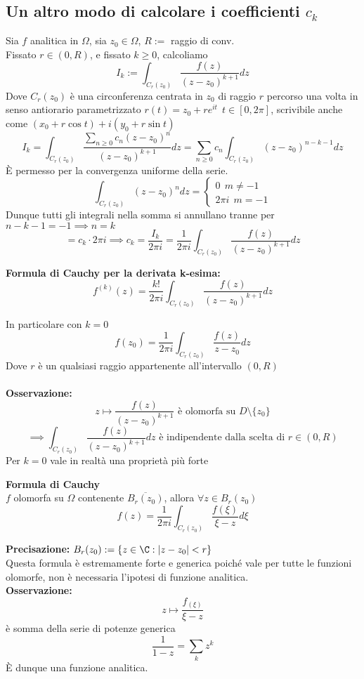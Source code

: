 \subsection{Un altro modo di calcolare i coefficienti $c_k$} 
Sia $f$ analitica in $\Omega$, sia $z_0\in\Omega$, $R:=$ raggio di conv.
\\Fissato $r\in(0,R)$, e fissato $k\ge 0$, calcoliamo 
\[I_k:=\int_{C_r(z_0)}^{} \frac{f(z)}{(z-z_0)^{k+1}}dz
\]
Dove $C_r(z_0)$ è una circonferenza centrata in $z_0$ di raggio $r$ percorso una volta in senso antiorario parametrizzato $r(t)=z_0+re^{i t}\ \ t\in[0,2\pi]$, scrivibile anche come $(x_0+r\cos t)+i(y_0+r\sin t)$
\[I_k=\int_{C_r(z_0)}^{} \frac{\sum_{n\ge 0}^{} c_n(z-z_0)^n}{(z-z_0)^{k+1}}dz=\sum_{n\ge 0}^{} c_n\int_{C_r(z_0)}^{} (z-z_0)^{n-k-1}dz\]
È permesso per la convergenza uniforme della serie.
\[\int_{C_r(z_0)}^{} (z-z_0)^ndz=\begin{cases}
	0\ \ m\neq -1\\2\pi i\ \ m=-1 
\end{cases}  \]
Dunque tutti gli integrali nella somma si annullano tranne per $n-k-1=-1\implies n=k$ 
\[=c_k\cdot 2\pi i\implies c_k= \frac{I_k}{2\pi i}= \frac{1}{2\pi i}\int_{C_r(z_0)}^{} \frac{f(z)}{(z-z_0)^{k+1}}dz\]
\begin{tcolorbox}
	\textbf{Formula di Cauchy per la derivata k-esima:} 
	\[f^{(k)}(z)=\frac{k!}{2\pi i}\int_{C_r(z_0)}^{} \frac{f(z)}{(z-z_0)^{k+1}}dz\]
\end{tcolorbox}
In particolare con $k=0$
\[f(z_0)=\frac{1}{2\pi i}\int_{C_r(z_0)}^{} \frac{f(z)}{z-z_0}dz\]
Dove $r$ è un qualsiasi raggio appartenente all'intervallo $(0,R)$
\\\divider
\\\textbf{Osservazione: } \[z\mapsto   \frac{f(z)}{(z-z_0)^{k+1}}\text{ è olomorfa su }D\setminus \{z_0\} \]
\[\implies \int_{C_r(z_0)}^{}  \frac{f(z)}{(z-z_0)^{k+1}}dz \text{ è indipendente dalla scelta di }r\in(0,R)\]
Per $k=0$ vale in realtà una proprietà più forte
\begin{tcolorbox}
	\textbf{Formula di Cauchy} \\
	$f$ olomorfa su $\Omega$ contenente $\overline{B_r(z_0)}$, allora $\forall z\in B_r(z_0)$
	\[f(z)=\frac{1}{2\pi i}\int_{C_r(z_0)}^{}  \frac{f(\xi)}{\xi-z}d\xi\]
\end{tcolorbox}
\textbf{Precisazione: }$B_r(z_0):=\{z\in\C: |z-z_0|<r\}$ 
\\Questa formula è estremamente forte e generica poiché vale per tutte le funzioni olomorfe, non è necessaria l'ipotesi di funzione analitica.
\\\textbf{Osservazione: }\[z\mapsto \frac{f_(\xi)}{\xi-z}\] è somma della serie di potenze generica 
\[\frac{1}{1-z}=\sum_{k}^{} z^k\]
È dunque una funzione analitica.
